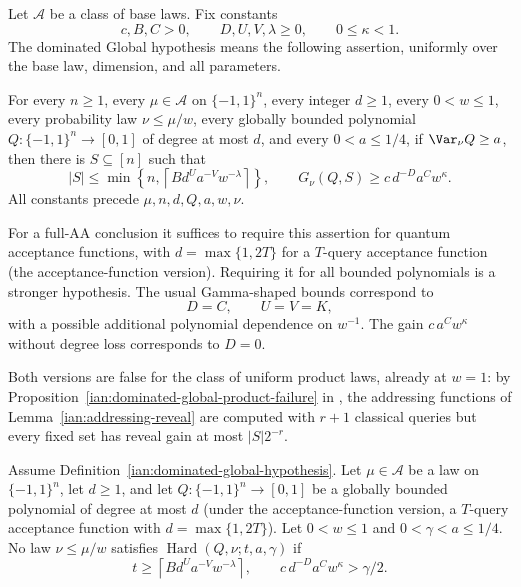 \begin{definition}
\label{ian:dominated-global-hypothesis}
Let \(\mathcal A\) be a class of base laws. Fix constants
\[
 c,B,C>0,\qquad D,U,V,\lambda\ge0,\qquad 0\le\kappa<1.
\]
The dominated Global hypothesis means the following assertion,
uniformly over the base law, dimension, and all parameters.

For every \(n\ge1\), every \(\mu\in\mathcal A\) on \(\{-1,1\}^n\), every
integer \(d\ge1\), every \(0<w\le1\), every probability law
\(\nu\le\mu/w\), every globally bounded polynomial
\(Q:\{-1,1\}^n\to[0,1]\) of degree at most \(d\), and every
\(0<a\le1/4\), if \(\Var_\nu Q\ge a\), then there is \(S\subseteq[n]\)
such that
\[
 |S|\le
 \min\left\{n,\left\lceil B d^U a^{-V}w^{-\lambda}\right\rceil\right\},
 \qquad
 G_\nu(Q,S)\ge c\,d^{-D}a^Cw^\kappa.
\]
All constants precede \(\mu,n,d,Q,a,w,\nu\).

For a full-AA conclusion it suffices to require this assertion for
quantum acceptance functions, with \(d=\max\{1,2T\}\) for a
\(T\)-query acceptance function (the acceptance-function version).
Requiring it for all bounded polynomials is a stronger hypothesis.
The usual Gamma-shaped bounds correspond to
\[
 D=C,\qquad U=V=K,
\]
with a possible additional polynomial dependence on \(w^{-1}\).
The gain \(c\,a^Cw^\kappa\) without degree loss corresponds to \(D=0\).

Both versions are false for the class of uniform product laws, already
at \(w=1\): by Proposition~\ref{ian:dominated-global-product-failure} in
, the addressing functions of
Lemma~\ref{ian:addressing-reveal} are computed with \(r+1\) classical
queries but every fixed set has reveal gain at most \(|S|2^{-r}\).
\end{definition}

\begin{proposition}
\label{ian:dominated-global-sector-exclusion}
Assume Definition~\ref{ian:dominated-global-hypothesis}. Let
\(\mu\in\mathcal A\) be a law on \(\{-1,1\}^n\), let \(d\ge1\), and let
\(Q:\{-1,1\}^n\to[0,1]\) be a globally bounded polynomial of degree at
most \(d\) (under the acceptance-function version, a \(T\)-query
acceptance function with \(d=\max\{1,2T\}\)). Let \(0<w\le1\) and
\(0<\gamma<a\le1/4\). No law \(\nu\le\mu/w\) satisfies
\(\operatorname{Hard}(Q,\nu;t,a,\gamma)\) if
\[
 t\ge\left\lceil B d^U a^{-V}w^{-\lambda}\right\rceil,
 \qquad
 c\,d^{-D}a^Cw^\kappa>\gamma/2.
\]
\end{proposition}


